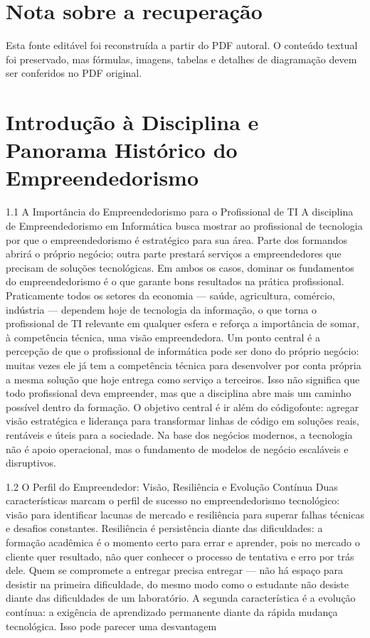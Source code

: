 \chapter*{Nota sobre a recuperação}


Esta fonte editável foi reconstruída a partir do PDF autoral. O conteúdo textual foi preservado, mas fórmulas, imagens, tabelas e detalhes de diagramação devem ser conferidos no PDF original.

\chapter{Introdução à Disciplina e Panorama Histórico do Empreendedorismo}

1.1 A Importância do Empreendedorismo para o Profissional de TI A disciplina de Empreendedorismo em Informática busca mostrar ao profissional de tecnologia por que o empreendedorismo é estratégico para sua área. Parte dos formandos abrirá o próprio negócio; outra parte prestará serviços a empreendedores que precisam de soluções tecnológicas. Em ambos os casos, dominar os fundamentos do empreendedorismo é o que garante bons resultados na prática profissional. Praticamente todos os setores da economia — saúde, agricultura, comércio, indústria — dependem hoje de tecnologia da informação, o que torna o profissional de TI relevante em qualquer esfera e reforça a importância de somar, à competência técnica, uma visão empreendedora. Um ponto central é a percepção de que o profissional de informática pode ser dono do próprio negócio: muitas vezes ele já tem a competência técnica para desenvolver por conta própria a mesma solução que hoje entrega como serviço a terceiros. Isso não significa que todo profissional deva empreender, mas que a disciplina abre mais um caminho possível dentro da formação. O objetivo central é ir além do códigofonte: agregar visão estratégica e liderança para transformar linhas de código em soluções reais, rentáveis e úteis para a sociedade. Na base dos negócios modernos, a tecnologia não é apoio operacional, mas o fundamento de modelos de negócio escaláveis e disruptivos.

1.2 O Perfil do Empreendedor: Visão, Resiliência e Evolução Contínua Duas características marcam o perfil de sucesso no empreendedorismo tecnológico: visão para identificar lacunas de mercado e resiliência para superar falhas técnicas e desafios constantes. Resiliência é persistência diante das dificuldades: a formação acadêmica é o momento certo para errar e aprender, pois no mercado o cliente quer resultado, não quer conhecer o processo de tentativa e erro por trás dele. Quem se compromete a entregar precisa entregar — não há espaço para desistir na primeira dificuldade, do mesmo modo como o estudante não desiste diante das dificuldades de um laboratório. A segunda característica é a evolução contínua: a exigência de aprendizado permanente diante da rápida mudança tecnológica. Isso pode parecer uma desvantagem

